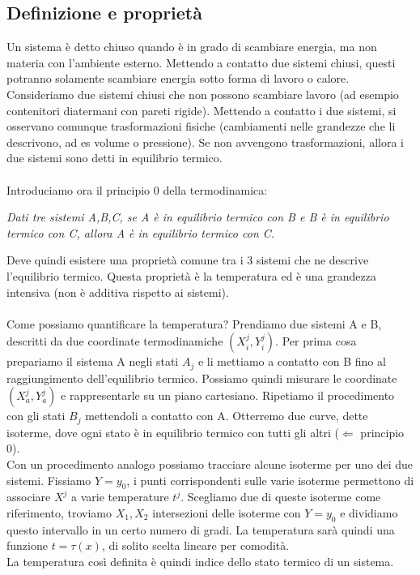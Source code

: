 \documentclass{article}
\begin{document}
\subsection{Definizione e proprietà}
Un sistema è detto chiuso quando è in grado di scambiare energia, ma non materia con l'ambiente esterno. Mettendo a contatto due sistemi chiusi, questi potranno solamente scambiare energia sotto forma di lavoro o calore.\\
Consideriamo due sistemi chiusi che non possono scambiare lavoro (ad esempio contenitori diatermani con pareti rigide). Mettendo a contatto i due sistemi, si osservano comunque trasformazioni fisiche (cambiamenti nelle grandezze che li descrivono, ad es volume o pressione). Se non avvengono trasformazioni, allora i due sistemi sono detti in equilibrio termico.\\\\
Introduciamo ora il principio 0 della termodinamica:
\begin{center}
    \textit{Dati tre sistemi A,B,C, se A è in equilibrio termico con B e B è in equilibrio termico con C, allora A è in equilibrio termico con C.}
\end{center}
Deve quindi esistere una proprietà comune tra i 3 sistemi che ne descrive l'equilibrio termico. Questa proprietà è la temperatura ed è una grandezza intensiva (non è additiva rispetto ai sistemi).\\\\
Come possiamo quantificare la temperatura? Prendiamo due sistemi A e B, descritti da due coordinate termodinamiche $(X_i^j,Y_i^j)$. Per prima cosa prepariamo il sistema A negli stati $A_j$ e li mettiamo a contatto con B fino al raggiungimento dell'equilibrio termico. Possiamo quindi misurare le coordinate $(X_a^j,Y_a^j)$ e rappresentarle su un piano cartesiano. Ripetiamo il procedimento con gli stati $B_j$ mettendoli a contatto con A. Otterremo due curve, dette isoterme, dove ogni stato è in equilibrio termico con tutti gli altri ($\Leftarrow$ principio 0).\\
Con un procedimento analogo possiamo tracciare alcune isoterme per uno dei due sistemi. Fissiamo $Y=y_0$, i punti corrispondenti sulle varie isoterme permettono di associare $X^j$ a varie temperature $t^j$. Scegliamo due di queste isoterme come riferimento, troviamo $X_1,X_2$ intersezioni delle isoterme con $Y=y_0$ e dividiamo questo intervallo in un certo numero di gradi. La temperatura sarà quindi una funzione $t=\tau(x)$, di solito scelta lineare per comodità.\\
La temperatura così definita è quindi indice dello stato termico di un sistema.
\end{document}
